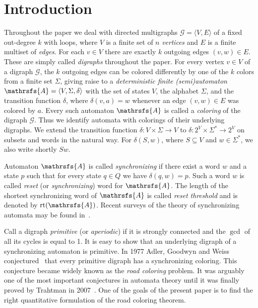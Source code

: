 \documentclass[runningheads]{llncs}
\DeclareMathOperator{\rt}{rt}
\begin{document}
\section{Introduction}

Throughout the paper we deal with directed multigraphs $\mathcal{G} = \langle V,E\rangle$ of a fixed out-degree $k$ with loops, where $V$ is a finite set of $n$ \emph{vertices} and $E$ is a finite multiset of \emph{edges}. For each $v \in V$ there are exactly $k$ outgoing edges $(v,w) \in E$. These are simply called \emph{digraphs} throughout the paper.
For every vertex $v \in V$ of a digraph $\mathcal{G}$, the $k$ outgoing edges can be colored differently by one of the $k$ colors from a finite set $\Sigma$, giving raise to a \emph{deterministic finite (semi)automaton} $\mathrsfs{A} = \langle V,\Sigma,\delta\rangle$ with the set of states $V$, the alphabet $\Sigma$, and the transition function $\delta$, where $\delta(v,a) = w$ whenever an edge $(v,w) \in E$ was colored by $a$. Every such automaton $\mathrsfs{A}$ is called a \emph{coloring} of the digraph $\mathcal{G}$.
Thus we identify automata with colorings of their underlying digraphs.
We extend the transition function $\delta\colon V \times \Sigma \to V$ to $\delta\colon 2^V \times \Sigma^* \to 2^V$ on subsets and words in the natural way.
For $\delta(S,w)$, where $S \subseteq V$ and $w \in \Sigma^*$, we also write shortly $S w$.

Automaton $\mathrsfs{A}$ is called \emph{synchronizing}
if there exist a word $w$ and a state $p$ such that for every state $q \in Q$ we have $\delta(q,w)=p$. Such a word $w$ is called \emph{reset} (or \emph{synchronizing}) word for $\mathrsfs{A}$.
The length of the shortest synchronizing word of $\mathrsfs{A}$ is called \emph{reset threshold} and is denoted by $\rt(\mathrsfs{A})$.
Recent surveys of the theory of synchronizing automata may be found in~\cite{KariVolkov2013Handbook,Volkov2008Survey}.

Call a digraph \emph{primitive} (or \emph{aperiodic}) if it is strongly connected and the $\gcd$ of all its cycles is equal to 1.
It is easy to show that an underlying digraph of a synchronizing automaton is primitive. In 1977 Adler, Goodwyn and Weiss conjectured~\cite{AGW1977} that every primitive digraph has a synchronizing coloring. This conjecture became widely known as the \emph{road coloring} problem. It was arguably one of the most important conjectures in automata theory until it was finally proved by Trahtman in 2007~\cite{Tr2009RoadColoring}. One of the goals of the present paper is to find the right quantitative formulation of the road coloring theorem. 
\end{document}
